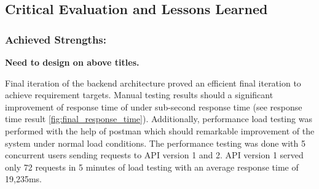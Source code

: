 \subsection{Critical Evaluation and Lessons Learned}

\subsubsection{Achieved Strengths:}

\textbf{Need to design on above titles.}

Final iteration of the backend architecture proved an efficient final iteration to achieve requirement targets. Manual testing results should a significant improvement of response time of under sub-second response time (see response time result \ref{fig:final_response_time}). Additionally, performance load testing was performed with the help of postman which should remarkable improvement of the system under normal load conditions. The performance testing was done with 5 concurrent users sending requests to API version 1 and 2. API version 1 served only 72 requests in 5 minutes of load testing with an average response time of 19,235ms. 







